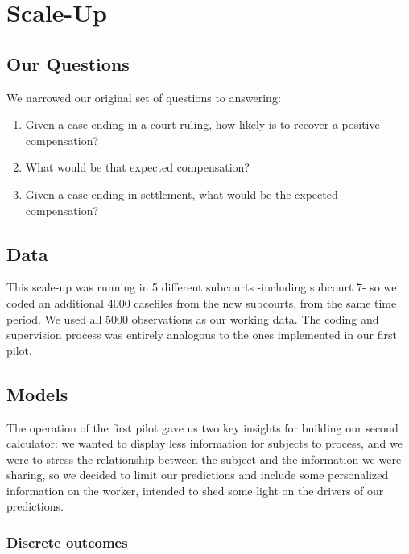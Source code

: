 \documentclass[]{article}
\begin{document}
\pagebreak

\section{Scale-Up}\label{scale-up}

\subsection{Our Questions}\label{our-questions-1}

We narrowed our original set of questions to answering:

\begin{enumerate}
\def\labelenumi{\arabic{enumi}.}
\item
  Given a case ending in a court ruling, how likely is to recover a
  positive compensation?
\item
  What would be that expected compensation?
\item
  Given a case ending in settlement, what would be the expected
  compensation?
\end{enumerate}

\subsection{Data}\label{data-1}

This scale-up was running in 5 different subcourts -including subcourt
7- so we coded an additional 4000 casefiles from the new subcourts, from
the same time period. We used all 5000 observations as our working data.
The coding and supervision process was entirely analogous to the ones
implemented in our first pilot.

\subsection{Models}\label{models-1}

The operation of the first pilot gave us two key insights for building
our second calculator: we wanted to display less information for
subjects to process, and we were to stress the relationship between the
subject and the information we were sharing, so we decided to limit our
predictions and include some personalized information on the worker,
intended to shed some light on the drivers of our predictions.

\subsubsection{Discrete outcomes}\label{discrete-outcomes-1}
\end{document}
